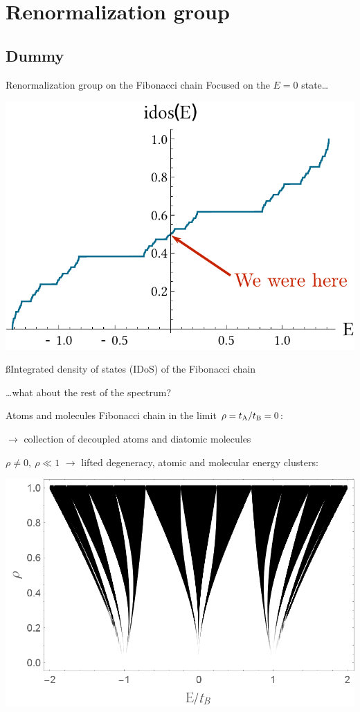 \section{Renormalization group}
\subsection{Dummy}

\begin{frame}{Renormalization group on the Fibonacci chain}
Focused on the $E=0$ state\dots

{\centering
\includegraphics[width=.5\textwidth]{img/3_part2/idos_fibo}

{\ss Integrated density of states (IDoS) of the Fibonacci chain}

}

\dots what about the rest of the spectrum?
\end{frame}

\begin{frame}{Atoms and molecules}
Fibonacci chain in the limit $\rho = t_{\text{A}}/t_{\text{B}} = 0$:

{\centering


}

$\to$ collection of decoupled atoms and diatomic molecules

$\rho \neq 0,~\rho \ll 1$ $\to$ lifted degeneracy, atomic and molecular energy clusters:

{\centering
\includegraphics[width=.4\textwidth]{img/3_part2/fibonacci_spectra_varying_rho}

}

\end{frame}

